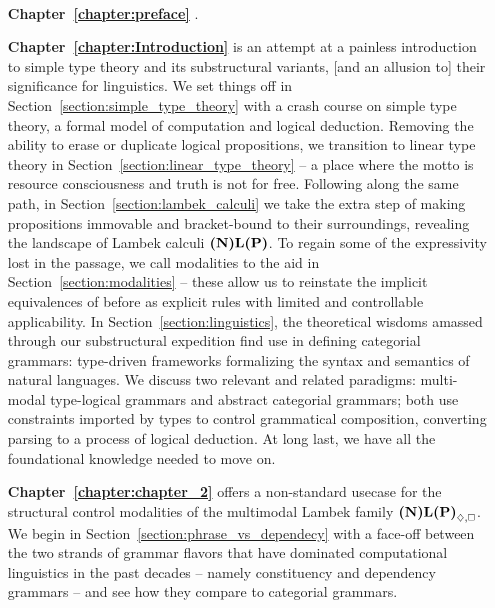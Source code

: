{\paragraph{}
\begin{enumerate}[labelindent=2pt, itemindent=30pt, labelsep=5pt, widest=Chapter III,align=right,itemsep=5pt]
\item[\textbf{Chapter~\ref{chapter:preface}}] .
\item[\textbf{Chapter~\ref{chapter:Introduction}}] is an attempt at a painless introduction to simple type theory and its substructural variants, [and an allusion to] their significance for linguistics.
We set things off in Section~\ref{section:simple_type_theory} with a crash course on simple type theory, a formal model of computation and logical deduction.
Removing the ability to erase or duplicate logical propositions, we transition to linear type theory in Section~\ref{section:linear_type_theory} -- a place where the motto is resource consciousness and truth is not for free.
Following along the same path, in Section~\ref{section:lambek_calculi} we take the extra step of making propositions immovable and bracket-bound to their surroundings, revealing the landscape of Lambek calculi $\textbf{(N)L(P)}$.
To regain some of the expressivity lost in the passage, we call modalities to the aid in Section~\ref{section:modalities} -- these allow us to reinstate the implicit equivalences of before as explicit rules with limited and controllable applicability.
In Section~\ref{section:linguistics}, the theoretical wisdoms amassed through our substructural expedition find use in defining categorial grammars: type-driven frameworks formalizing the syntax and semantics of natural languages.
We discuss two relevant and related paradigms: multi-modal type-logical grammars and abstract categorial grammars; both use constraints imported by types to control grammatical composition, converting parsing to a process of logical deduction.
At long last, we have all the foundational knowledge needed to move on.
\item[\textbf{Chapter~\ref{chapter:chapter_2}}] offers a non-standard usecase for the structural control modalities of the multimodal Lambek family $\logic{(N)L(P)}_{\diamond, \bx}$.
We begin in Section~\ref{section:phrase_vs_dependecy} with a face-off between the two strands of grammar flavors that have dominated computational linguistics in the past decades -- namely constituency  and dependency grammars -- and see how they compare to categorial grammars.

\end{enumerate}}
